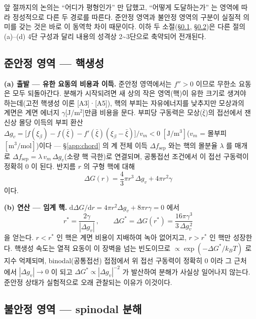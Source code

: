 \documentclass[11pt,a4paper]{article}
\newcommand{\dd}{\mathrm{d}}
\begin{document}
앞 절까지의 논의는 ``어디가 평형인가'' 만 답했고, ``어떻게 도달하는가'' 는 영역에 따라 정성적으로
다른 두 경로를 따른다. 준안정 영역과 불안정 영역의 구분이 실질적 의미를 갖는 것은 바로 이 동역학
차이 때문이다. 이하 두 소절(\S\ref{app:nucleation}, \S\ref{app:spindecomp})은 다른 절의 (a)--(d) 4단
구성과 달리 내용의 성격상 2\textasciitilde3단으로 축약되어 전개된다.

\subsection{준안정 영역 --- 핵생성}\label{app:nucleation}

\textbf{(a) 출발 --- 유한 요동의 비용과 이득.} 준안정 영역에서는 $f''>0$ 이므로 무한소 요동은 모두
되돌아간다. 분해가 시작되려면 새 상의 작은 영역(핵)이 유한 크기로 생겨야 하는데(고전 핵생성 이론 [A3]·[A5]), 핵의
부피는 자유에너지를 낮추지만 모상과의 계면은 계면 에너지 $\gamma$[J/m$^2$]만큼 비용을 문다. 부피당
구동력은 모상($\bar\xi$)의 접선에서 잰 신상 몰당 이득의 부피 환산
$\Delta g_v=\bigl[f(\xi_\beta)-f(\bar\xi)-f'(\bar\xi)(\xi_\beta-\bar\xi)\bigr]/v_m<0\;[\mathrm{J/m^3}]$($v_m$ =
몰부피 $[\mathrm{m^3/mol}]$)이다
--- \S\ref{app:chord} 의 계 전체 이득 $\Delta f_\mathrm{sep}$ 와는 핵의 몰분율 $\lambda$ 를 매개로
$\Delta f_\mathrm{sep}=\lambda\,v_m\,\Delta g_v$(소량 핵 극한)로 연결되며, 공통접선 조건에서 이 접선
구동력이 정확히 $0$ 이 된다. 반지름 $r$ 의 구형 핵에 대해
\begin{equation}
\Delta G(r)=\frac{4}{3}\pi r^3\,\Delta g_v+4\pi r^2\gamma
\label{eq:app-cnt}
\end{equation}
이다.

\textbf{(b) 연산 --- 임계 핵.} $\dd\Delta G/\dd r=4\pi r^2\Delta g_v+8\pi r\gamma=0$ 에서
\begin{equation}
r^\ast=\frac{2\gamma}{|\Delta g_v|}\,,\qquad
\Delta G^\ast=\Delta G(r^\ast)=\frac{16\pi\gamma^3}{3\,\Delta g_v^{\,2}}
\label{eq:app-rstar}
\end{equation}
을 얻는다. $r<r^\ast$ 인 핵은 계면 비용이 지배하여 녹아 없어지고, $r>r^\ast$ 인 핵만 성장한다. 핵생성
속도는 열적 요동이 이 장벽을 넘는 빈도이므로 $\propto\exp(-\Delta G^\ast/k_BT)$ 로 지수 억제되며,
binodal(공통접선) 접점에서 위 접선 구동력이 정확히 $0$ 이라 그 근처에서
$|\Delta g_v|\to0$ 이 되고 $\Delta G^\ast\propto|\Delta g_v|^{-2}$ 가 발산하여
분해가 사실상 일어나지 않는다. 준안정 상태가 실험적으로 오래 관찰되는 이유가 이것이다.

\subsection{불안정 영역 --- spinodal 분해}\label{app:spindecomp}
\end{document}
